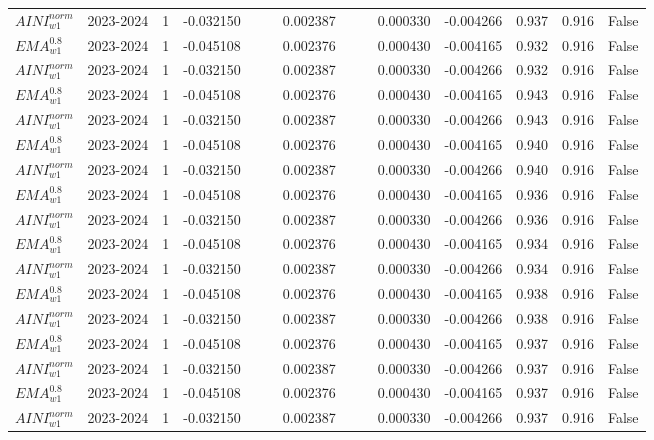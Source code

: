 \begin{tabular}{@{}llrrrrrrrrrlll@{}}
$AINI^{norm}_{w1}$ & 2023-2024 & 1 & -0.032150 &  &  & 0.002387 &  &  & 0.000330 & -0.004266 & 0.937 & 0.916 & False \\
$EMA^{0.8}_{w1}$ & 2023-2024 & 1 & -0.045108 &  &  & 0.002376 &  &  & 0.000430 & -0.004165 & 0.932 & 0.916 & False \\
$AINI^{norm}_{w1}$ & 2023-2024 & 1 & -0.032150 &  &  & 0.002387 &  &  & 0.000330 & -0.004266 & 0.932 & 0.916 & False \\
$EMA^{0.8}_{w1}$ & 2023-2024 & 1 & -0.045108 &  &  & 0.002376 &  &  & 0.000430 & -0.004165 & 0.943 & 0.916 & False \\
$AINI^{norm}_{w1}$ & 2023-2024 & 1 & -0.032150 &  &  & 0.002387 &  &  & 0.000330 & -0.004266 & 0.943 & 0.916 & False \\
$EMA^{0.8}_{w1}$ & 2023-2024 & 1 & -0.045108 &  &  & 0.002376 &  &  & 0.000430 & -0.004165 & 0.940 & 0.916 & False \\
$AINI^{norm}_{w1}$ & 2023-2024 & 1 & -0.032150 &  &  & 0.002387 &  &  & 0.000330 & -0.004266 & 0.940 & 0.916 & False \\
$EMA^{0.8}_{w1}$ & 2023-2024 & 1 & -0.045108 &  &  & 0.002376 &  &  & 0.000430 & -0.004165 & 0.936 & 0.916 & False \\
$AINI^{norm}_{w1}$ & 2023-2024 & 1 & -0.032150 &  &  & 0.002387 &  &  & 0.000330 & -0.004266 & 0.936 & 0.916 & False \\
$EMA^{0.8}_{w1}$ & 2023-2024 & 1 & -0.045108 &  &  & 0.002376 &  &  & 0.000430 & -0.004165 & 0.934 & 0.916 & False \\
$AINI^{norm}_{w1}$ & 2023-2024 & 1 & -0.032150 &  &  & 0.002387 &  &  & 0.000330 & -0.004266 & 0.934 & 0.916 & False \\
$EMA^{0.8}_{w1}$ & 2023-2024 & 1 & -0.045108 &  &  & 0.002376 &  &  & 0.000430 & -0.004165 & 0.938 & 0.916 & False \\
$AINI^{norm}_{w1}$ & 2023-2024 & 1 & -0.032150 &  &  & 0.002387 &  &  & 0.000330 & -0.004266 & 0.938 & 0.916 & False \\
$EMA^{0.8}_{w1}$ & 2023-2024 & 1 & -0.045108 &  &  & 0.002376 &  &  & 0.000430 & -0.004165 & 0.937 & 0.916 & False \\
$AINI^{norm}_{w1}$ & 2023-2024 & 1 & -0.032150 &  &  & 0.002387 &  &  & 0.000330 & -0.004266 & 0.937 & 0.916 & False \\
$EMA^{0.8}_{w1}$ & 2023-2024 & 1 & -0.045108 &  &  & 0.002376 &  &  & 0.000430 & -0.004165 & 0.937 & 0.916 & False \\
$AINI^{norm}_{w1}$ & 2023-2024 & 1 & -0.032150 &  &  & 0.002387 &  &  & 0.000330 & -0.004266 & 0.937 & 0.916 & False \\

\end{tabular}
